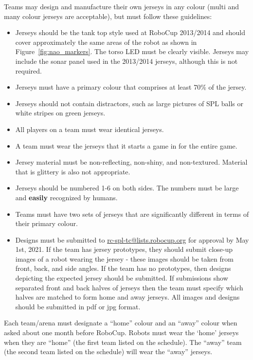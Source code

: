 Teams may design and manufacture their own jerseys in any colour (multi and many colour jerseys are acceptable), but must follow these guidelines:
\begin{itemize}
	\item Jerseys should be the tank top style used at RoboCup 2013/2014 and should cover approximately the same areas of the robot as shown in Figure~\ref{fig:nao_markers}.  The torso LED must be clearly visible.  Jerseys may include the sonar panel used in the 2013/2014 jerseys, although this is not required.
	\item Jerseys must have a primary colour that comprises at least 70\% of the jersey.
	\item Jerseys should not contain distractors, such as large pictures of SPL balls or white stripes on green jerseys.
	\item All players on a team must wear identical jerseys.
	\item A team must wear the jerseys that it starts a game in for the entire game.
	\item Jersey material must be non-reflecting, non-shiny, and non-textured.  Material that is glittery is also not appropriate.
	\item Jerseys should be numbered 1-6 on both sides. The numbers must be large and {\bf easily} recognized by humans. 
	\item Teams must have two sets of jerseys that are significantly different in terms of their primary colour.
	\item Designs must be submitted to \url{rc-spl-tc@lists.robocup.org} for approval by May 1st, 2021. If the team has jersey prototypes, they should submit close-up images of a robot wearing the jersey - these images should be taken from front, back, and side angles.  If the team has no prototypes, then designs depicting the expected jersey should be submitted.  If submissions show separated front and back halves of jerseys then the team must specify which halves are matched to form home and away jerseys.  All images and designs should be submitted in pdf or jpg format.
\end{itemize}

Each team/arena must designate a ``home'' colour and an ``away'' colour when asked about one month before RoboCup. Robots must wear the `home' jerseys when they are ``home'' (the first team listed on the schedule). The ``away'' team (the second team listed on the schedule) will wear the ``away'' jerseys.

